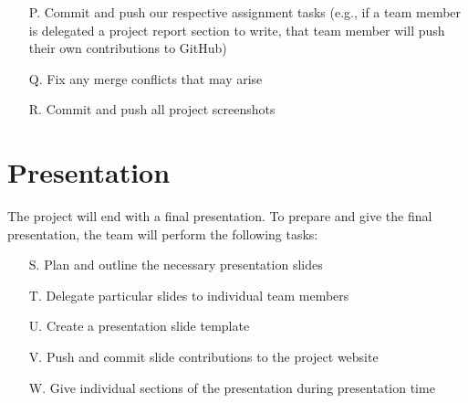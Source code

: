 \begin{itemize}
    \item [P.] \label{task:P} Commit and push our respective assignment tasks (e.g., if a
          team member is delegated a project report section to write, that
          team member will push their own contributions to GitHub)
    \item [Q.] \label{task:Q} Fix any merge conflicts that may arise
    \item [R.] \label{task:R} Commit and push all project screenshots
\end{itemize}

\section{Presentation}
\label{sec:presentation}

The project will end with a final presentation. To prepare and give the
final presentation, the team will perform the following tasks:

\begin{itemize}
    \item [S.] \label{task:S} Plan and outline the necessary presentation slides
    \item [T.] \label{task:T} Delegate particular slides to individual team members
    \item [U.] \label{task:U} Create a presentation slide template
    \item [V.] \label{task:V} Push and commit slide contributions to the project website
    \item [W.] \label{task:W} Give individual sections of the presentation during presentation
          time
\end{itemize}
